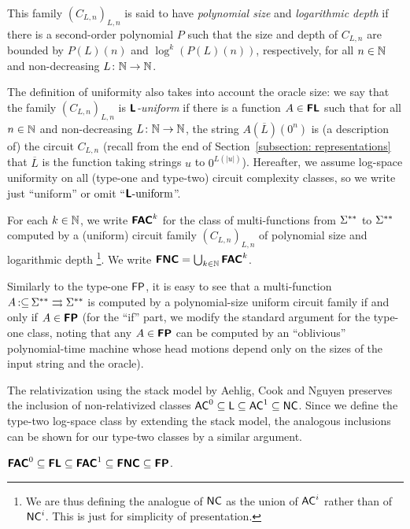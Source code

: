 \documentclass[a4paper,UKenglish]{lipics}
\newcommand{\pcolon}{\mathpunct{\,:\subseteq}}
\begin{document}
This family $(C_{L,n})_{L,n}$ is said to have
\emph{polynomial size} and \emph{logarithmic depth}
if there is a second-order polynomial $P$ such that 
the size and depth of $C _{L,n}$ are 
bounded by $P (L) (n)$ and $\log^k (P(L)(n))$, respectively, 
for all $n \in \mathbb N$ and non-decreasing $L \colon \mathbb N \to \mathbb N$.

The definition of uniformity 
also takes into account the oracle size: 
we say that the family $(C_{L,n})_{L,n}$ is 
\emph{$\text{\bfseries \sffamily \upshape L}$-uniform} if 
there is a function $A \in \text{\bfseries \sffamily \upshape FL}$ such that 
for all $n \in \mathbb N$ and non-decreasing $L \colon \mathbb N \to \mathbb N$, 
the string $A (\overline L) (0^n)$ is (a description of) the circuit $C_{L,n}$ 
(recall from the end of Section~\ref{subsection: representations} 
that $\overline L$ is the function taking strings $u$ to $0 ^{L (\lvert u \rvert)}$). 
Hereafter, we assume log-space uniformity on all (type-one and type-two) 
circuit complexity classes, so we write just ``uniform'' or omit ``$\text{\bfseries \sffamily \upshape L}\text{-uniform}$''.

\begin{definition}
 For each $k \in \mathbb N$, 
 we write $\text{\bfseries \sffamily \upshape FAC}^k$ for the class of 
 multi-functions from $\Sigma ^{**}$ to $\Sigma ^{**}$ computed by
 a (uniform) circuit family $(C_{L,n})_{L,n}$ of polynomial size and logarithmic depth%
\footnote{We are thus defining the analogue of $\mathsf{NC}$ as the union of 
$\mathsf{AC}^i$ rather than of $\mathsf{NC}^i$.  This is just for simplicity of presentation.}. 
 We write $\text{\bfseries \sffamily \upshape FNC} = \bigcup_{k \in \mathbb N} \text{\bfseries \sffamily \upshape FAC}^k$.
\end{definition}

Similarly to the type-one $\mathsf{FP}$, it is easy to see that
a multi-function $A \pcolon \LM \rightrightarrows \LM$ is computed by a polynomial-size
uniform circuit family if and only if $A \in \text{\bfseries \sffamily \upshape FP}$
(for the ``if'' part, we modify the standard argument for the type-one class, 
noting that any $A \in \text{\bfseries \sffamily \upshape FP}$ can be computed by 
an ``oblivious'' polynomial-time machine 
whose head motions depend only on the sizes of 
the input string and the oracle).

The relativization using the stack model by Aehlig, Cook and Nguyen preserves
the inclusion of non-relativized classes
$\mathsf{AC}^0 \subseteq \mathsf{L} \subseteq \mathsf{AC}^1 \subseteq \mathsf{NC}$.
Since we define the type-two log-space class by extending the stack model,
the analogous inclusions can be shown for our type-two classes
by a similar argument. 

\begin{theorem}
\label{theorem:inclusion}
$ \text{\bfseries \sffamily \upshape FAC}^0
 \subseteq \text{\bfseries \sffamily \upshape FL} 
 \subseteq \text{\bfseries \sffamily \upshape FAC}^1
 \subseteq \text{\bfseries \sffamily \upshape FNC}
 \subseteq \text{\bfseries \sffamily \upshape FP}$. 
\end{theorem}
\end{document}

